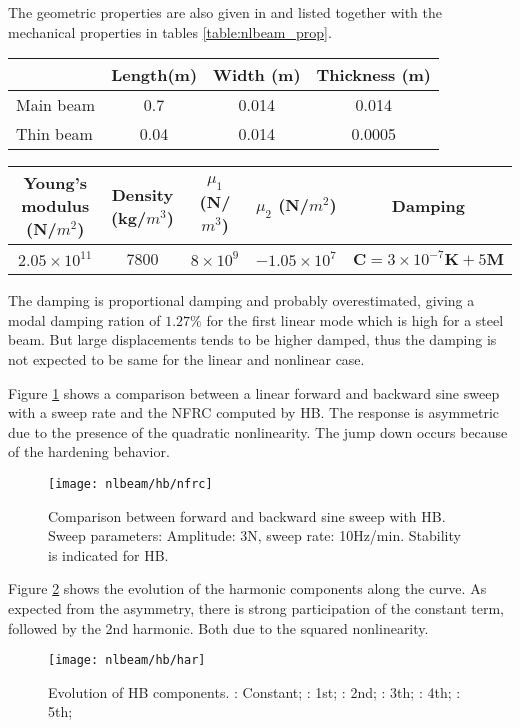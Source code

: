 The geometric properties are also given in \autocite{lenaerts2003a} and listed
together with the mechanical properties in tables \ref{table:nlbeam_prop}.
\begin{center}
\begin{tabular}{l*{3}{c}}
  & Length(m) & Width (m) & Thickness (m) \\
  \hline
  Main beam & 0.7 & 0.014 & 0.014 \\
  Thin beam & 0.04 & 0.014 & 0.0005 \\
  \hline
\end{tabular}
\begin{tabular}{*{5}{c}}
  Young's modulus (N/$m^2$) & Density (kg/$m^3$) & $\mu_1$ (N/$m^3$) & $\mu_2$ (N/$m^2$) & Damping  \\
  \hline
  $2.05\times 10^{11}$ & 7800 & $8\times 10^{9}$ & $-1.05\times 10^{7}$ &  $\bm C = 3 \times 10^{-7} \bm K + 5\bm M$ \\
  \hline
\end{tabular}
\label{table:nlbeam_prop}
\end{center}


The damping is proportional damping and probably overestimated, giving a modal
damping ration of $1.27\%$ for the first linear mode which is high for a steel
beam. But large displacements tends to be higher damped, thus the damping is not
expected to be same for the linear and nonlinear case.

Figure \ref{fig:nlbeam_sweep} shows a comparison between a linear forward and
backward sine sweep with a sweep rate and the NFRC computed by HB. The response
is asymmetric due to the presence of the quadratic nonlinearity. The jump down
occurs because of the hardening behavior.

\begin{figure}[!ht]
  \centering
  \texttt{[image: nlbeam/hb/nfrc]}
  \caption{Comparison between forward and backward sine sweep with HB. Sweep
    parameters: Amplitude: 3N, sweep rate: 10Hz/min. Stability is indicated for
    HB.}
  \label{fig:nlbeam_sweep}
\end{figure}

Figure \ref{fig:nlbeam_hb_components} shows the evolution of the harmonic
components along the curve. As expected from the asymmetry, there is strong
participation of the constant term, followed by the 2nd harmonic. Both due to
the squared nonlinearity.

\begin{figure}[!ht]
  \centering
  \texttt{[image: nlbeam/hb/har]}
  \caption{Evolution of HB components.
    \textcolor{blue}{\sampleline{}}: Constant;
    \sampleline{}: 1st;
    \textcolor{orange}{}: 2nd;
    \textcolor{green}{}: 3th;
    \textcolor{red}{\sampleline{}}: 4th;
    \textcolor{purple}{}: 5th;
  }
  \label{fig:nlbeam_hb_components}
\end{figure}

